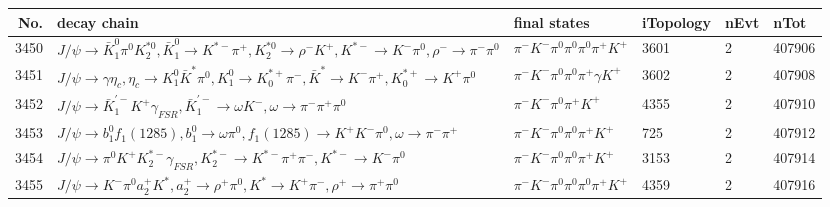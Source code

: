 \begin{table}[htbp] 
\begin{center}
\begin{small}
\begin{tabular}{rlllll}\hline\hline
 No. & decay chain & final states &  iTopology & nEvt & nTot \\\hline
3450&$J/\psi       \rightarrow \bar{K}_1^{0} \pi^{0}        K_2^{*0}       , \bar{K}_1^{0}  \rightarrow K^{*-}         \pi^{+}        , K_2^{*0}        \rightarrow \rho^{-}      K^{+}          , K^{*-}          \rightarrow K^{-}          \pi^{0}        , \rho^{-}       \rightarrow \pi^{-}        \pi^{0}        $&$\pi^{-}        K^{-}          \pi^{0}        \pi^{0}        \pi^{0}        \pi^{+}        K^{+}          $& 3601&    2&407906\\
3451&$J/\psi       \rightarrow \gamma       \eta_{c}    , \eta_{c}     \rightarrow K_1^{0}        \bar{K}^{*}   \pi^{0}        , K_1^{0}         \rightarrow K_{0}^{*+}     \pi^{-}        , \bar{K}^{*}    \rightarrow K^{-}          \pi^{+}        , K_{0}^{*+}      \rightarrow K^{+}          \pi^{0}        $&$\pi^{-}        K^{-}          \pi^{0}        \pi^{0}        \pi^{+}        \gamma       K^{+}          $& 3602&    2&407908\\
3452&$J/\psi       \rightarrow \bar{K}_1^{'-}K^{+}          \gamma_{FSR} , \bar{K}_1^{'-} \rightarrow \omega         K^{-}          , \omega          \rightarrow \pi^{-}        \pi^{+}        \pi^{0}        $&$\pi^{-}        K^{-}          \pi^{0}        \pi^{+}        K^{+}          $& 4355&    2&407910\\
3453&$J/\psi       \rightarrow b_{1}^{0}      f_{1}(1285)    , b_{1}^{0}       \rightarrow \omega         \pi^{0}        , f_{1}(1285)     \rightarrow K^{+}          K^{-}          \pi^{0}        , \omega          \rightarrow \pi^{-}        \pi^{+}        $&$\pi^{-}        K^{-}          \pi^{0}        \pi^{0}        \pi^{+}        K^{+}          $&  725&    2&407912\\
3454&$J/\psi       \rightarrow \pi^{0}        K^{+}          K_2^{*-}       \gamma_{FSR} , K_2^{*-}        \rightarrow K^{*-}         \pi^{+}        \pi^{-}        , K^{*-}          \rightarrow K^{-}          \pi^{0}        $&$\pi^{-}        K^{-}          \pi^{0}        \pi^{0}        \pi^{+}        K^{+}          $& 3153&    2&407914\\
3455&$J/\psi       \rightarrow K^{-}          \pi^{0}        a_{2}^{+}      K^{*}          , a_{2}^{+}       \rightarrow \rho^{+}      \pi^{0}        , K^{*}           \rightarrow K^{+}          \pi^{-}        , \rho^{+}       \rightarrow \pi^{+}        \pi^{0}        $&$\pi^{-}        K^{-}          \pi^{0}        \pi^{0}        \pi^{0}        \pi^{+}        K^{+}          $& 4359&    2&407916\\

\end{tabular}
\end{small}
\end{center}
\end{table}
